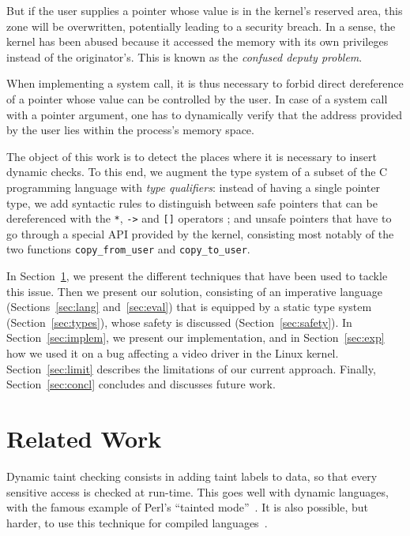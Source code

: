 But if the user supplies a pointer whose value is in the kernel's reserved area,
this zone will be overwritten, potentially leading to a security breach. In a
sense, the kernel has been abused because it accessed the memory with its own
privileges instead of the originator's. This is known as the \emph{confused
deputy problem}\cite{hardy88confused}.

When implementing a system call, it is thus necessary to forbid direct
dereference of a pointer whose value can be controlled by the user. In case of a
system call with a pointer argument, one has to dynamically verify that the
address provided by the user lies within the process's memory space.

The object of this work is to detect the places where it is necessary to insert
dynamic checks. To this end, we augment the type system of a subset of the C
programming language with \emph{type qualifiers}: instead of having a single
pointer type, we add syntactic rules to distinguish between safe pointers that
can be dereferenced with the \texttt{*}, \texttt{->} and \texttt{[]} operators ;
and unsafe pointers that have to go through a special API provided by the
kernel, consisting most notably of the two functions \texttt{copy\_from\_user}
and \texttt{copy\_to\_user}.

In Section~\ref{sec:related}, we present the different techniques that have been
used to tackle this issue. Then we present our solution, consisting of an
imperative language (Sections~\ref{sec:lang} and~\ref{sec:eval}) that is
equipped by a static type system (Section~\ref{sec:types}), whose safety is
discussed (Section~\ref{sec:safety}). In Section~\ref{sec:implem}, we present
our implementation, and in Section~\ref{sec:exp} how we used it on a bug
affecting a video driver in the Linux kernel. Section~\ref{sec:limit} describes
the limitations of our current approach. Finally, Section~\ref{sec:concl}
concludes and discusses future work.

\section{Related Work}
\label{sec:related}

Dynamic taint checking consists in adding taint labels to data, so that every
sensitive access is checked at run-time. This goes well with dynamic languages,
with the famous example of Perl's ``tainted mode''~\cite{perlCamelBook}. It is
also possible, but harder, to use this technique for compiled
languages~\cite{clause-etal-issta07}.

